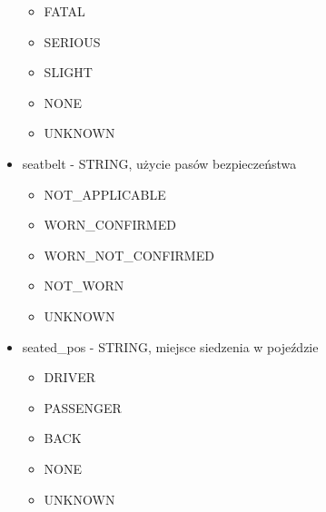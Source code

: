 \begin{itemize}
  \begin{itemize}
  \itemsep-14pt\parskip0pt
  \item
    FATAL\\
  \item
    SERIOUS\\
  \item
    SLIGHT\\
  \item
    NONE\\
  \item
    UNKNOWN\\
  \end{itemize}
\item
  seatbelt - STRING, użycie pasów bezpieczeństwa

  \begin{itemize}
  \itemsep-14pt\parskip0pt
  \item
    NOT\_APPLICABLE\\
  \item
    WORN\_CONFIRMED\\
  \item
    WORN\_NOT\_CONFIRMED\\
  \item
    NOT\_WORN\\
  \item
    UNKNOWN\\
  \end{itemize}
\item
  seated\_pos - STRING, miejsce siedzenia w pojeździe

  \begin{itemize}
  \itemsep-14pt\parskip0pt
  \item
    DRIVER\\
  \item
    PASSENGER\\
  \item
    BACK\\
  \item
    NONE\\
  \item
    UNKNOWN
  \end{itemize}
\end{itemize}
